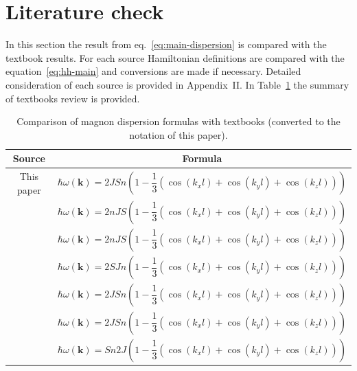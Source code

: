 \documentclass[a4paper,12pt]{article}
\begin{document}
        \section{Literature check}
        In this section the result from eq.~\eqref{eq:main-dispersion} is compared with the textbook results. 
        For each source Hamiltonian definitions are compared with the equation~\eqref{eq:hh-main} and conversions are made if necessary. 
        Detailed consideration of each source is provided in Appendix~II. In Table~\ref{tab:literature-review} the summary of textbooks review is provided.

        \begin{table}[H]
            \centering
            \caption{Comparison of magnon dispersion formulas with textbooks (converted to the notation of this paper).}
            \label{tab:literature-review}
            \def\arraystretch{2.5}
            \begin{tabular}{|c|c|}
                \hline
                Source                             & Formula                                                                                                        \\ \hline
                This paper                         & $\hbar\omega(\mathbf{k}) = 2JSn\left(1 - \dfrac{1}{3}\left(\cos(k_xl) + \cos(k_yl) + \cos(k_zl)\right)\right)$ \\ \hline
                \cite{rezende2020fundamentals}     & $\hbar\omega(\mathbf{k}) = 2nJS\left(1 - \dfrac{1}{3}\left(\cos(k_xl) + \cos(k_yl) + \cos(k_zl)\right)\right)$ \\ \hline
                \cite{blundell2003magnetism}       & $\hbar\omega(\mathbf{k}) = 2nJS\left(1 - \dfrac{1}{3}\left(\cos(k_xl) + \cos(k_yl) + \cos(k_zl)\right)\right)$ \\ \hline
                \cite{gurevich1996magnetization}   & $\hbar\omega(\mathbf{k}) = 2SJn\left(1 - \dfrac{1}{3}\left(\cos(k_xl) + \cos(k_yl) + \cos(k_zl)\right)\right)$ \\ \hline
                \cite{simon2013oxford}             & $\hbar\omega(\mathbf{k}) = 2JSn\left(1 - \dfrac{1}{3}\left(\cos(k_xl) + \cos(k_yl) + \cos(k_zl)\right)\right)$ \\ \hline
                \cite{coey2010magnetism}           & $\hbar\omega(\mathbf{k}) = 2JSn\left(1 - \dfrac{1}{3}\left(\cos(k_xl) + \cos(k_yl) + \cos(k_zl)\right)\right)$ \\ \hline
                \cite{jensen1991rare}              & $\hbar\omega(\mathbf{k}) = Sn2J\left(1 - \dfrac{1}{3}\left(\cos(k_xl) + \cos(k_yl) + \cos(k_zl)\right)\right)$ \\ \hline
            \end{tabular}
        \end{table}

    

    

    \newpage
     
     
\end{document}
